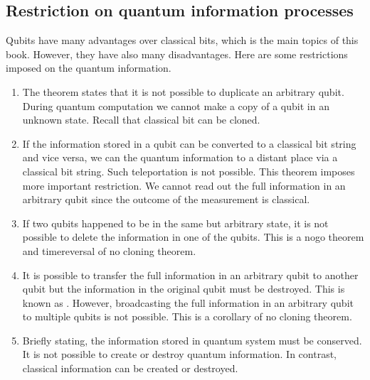 \documentclass[letterpaper,10pt,english]{jupyterBook}
\begin{document}
\subsection{Restriction on quantum information processes}
\label{\detokenize{computation/qinfo:restriction-on-quantum-information-processes}}
\sphinxAtStartPar
Qubits have many advantages over classical bits, which is the main topics of this book.  However, they have also many disadvantages.  Here are some restrictions imposed on the quantum information.
\begin{enumerate}
%
\item {}
\sphinxAtStartPar
{}The theorem states that it is not possible to duplicate an arbitrary qubit.   During quantum computation we cannot make a copy of a qubit in an unknown state.  Recall that classical bit can be cloned.

\item {}
\sphinxAtStartPar
{}If the information stored in a qubit can be converted to a classical bit string and vice versa, we can  the quantum information to a distant place via a classical bit string. Such teleportation is not possible.  This theorem imposes more important restriction.  We cannot read out the full information in an arbitrary qubit since the outcome of the measurement is classical.

\item {}
\sphinxAtStartPar
{}If two qubits happened to be in the same but arbitrary state, it is not possible to delete the information in one of the qubits.  This is a no\sphinxhyphen{}go theorem and time\sphinxhyphen{}reversal of no cloning theorem.

\item {}
\sphinxAtStartPar
{}It is possible to transfer the full information in an arbitrary qubit to another qubit but the information in the original qubit must be destroyed.  This is known as .  However, broadcasting the full information in an arbitrary qubit to multiple qubits is not possible. This is a corollary of no cloning theorem.

\item {}
\sphinxAtStartPar
{}Briefly stating, the information stored in quantum system must be conserved. It is not possible to create or destroy quantum information.  In contrast, classical information can be created or destroyed.

\end{enumerate}
\end{document}
